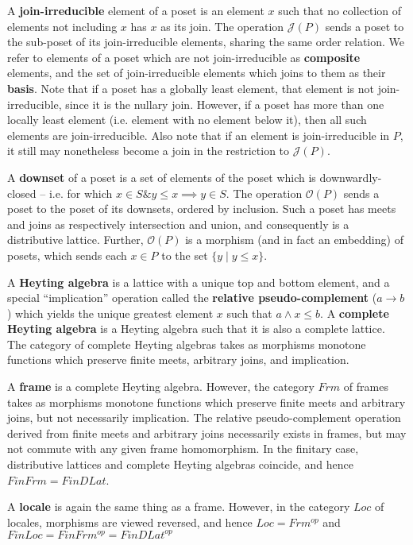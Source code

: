 \documentclass[a4paper,USenglish,cleveref, autoref, thm-restate,authorcolumns]{lipics-v2019}
\newcommand{\Oc}{\mathcal{O}}
\newcommand{\Jc}{\mathcal{J}}
\newcommand{\band}{\mathop{\&}}
\begin{document}
A \textbf{join-irreducible} element of a poset is an element \(x\) such that no collection of elements not including \(x\) has \(x\) as its join. The operation \(\Jc(P)\) sends a poset to the sub-poset of its join-irreducible elements, sharing the same order relation. We refer to elements of a poset which are not join-irreducible as \textbf{composite} elements, and the set of join-irreducible elements which joins to them as their \textbf{basis}. Note that if a poset has a globally least element, that element is not join-irreducible, since it is the nullary join. However, if a poset has more than one locally least element (i.e. element with no element below it), then all such elements are join-irreducible. Also note that if an element is join-irreducible in \(P\), it still may nonetheless become a join in the restriction to \(\Jc(P)\).

A \textbf{downset} of a poset is a set of elements of the poset which is downwardly-closed -- i.e. for which \(x \in S \band y \le x \implies y \in S\). The operation \(\Oc(P)\) sends a poset to the poset of its downsets, ordered by inclusion. Such a poset has meets and joins as respectively intersection and union, and consequently is a distributive lattice. Further, \(\Oc(P)\) is a morphism (and in fact an embedding) of posets, which sends each \(x \in P\) to the set \(\{y \mathbin{|} y \le x\}\).

A \textbf{Heyting algebra} is a lattice with a unique top and bottom element, and a special ``implication'' operation called the \textbf{relative pseudo-complement} (\(a \rightarrow b\)) which yields the unique greatest element \(x\) such that \(a \wedge x \le b\). A \textbf{complete Heyting algebra} is a Heyting algebra such that it is also a complete lattice. The category of complete Heyting algebras takes as morphisms monotone functions which preserve finite meets, arbitrary joins, and implication.

A \textbf{frame} is a complete Heyting algebra. However, the category \(Frm\) of frames takes as morphisms monotone functions which preserve finite meets and arbitrary joins, but not necessarily implication. The relative pseudo-complement operation derived from finite meets and arbitrary joins necessarily exists in frames, but may not commute with any given frame homomorphism. In the finitary case, distributive lattices and complete Heyting algebras coincide, and hence \(FinFrm = FinDLat\).

A \textbf{locale} is again the same thing as a frame. However, in the category \(Loc\) of locales, morphisms are viewed reversed, and hence \(Loc = Frm^{op}\) and \(FinLoc = FinFrm^{op} = FinDLat^{op}\)
\end{document}
